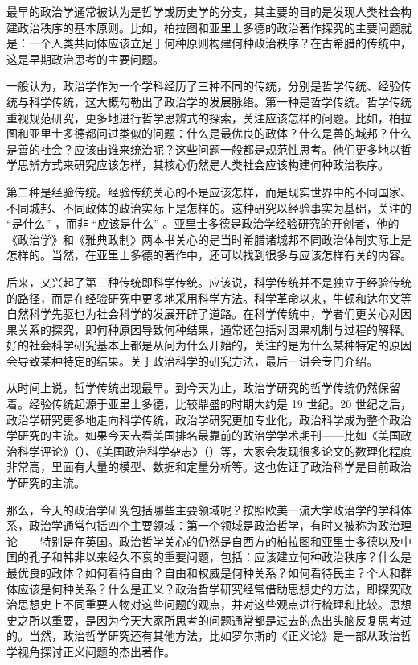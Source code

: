 最早的政治学通常被认为是哲学或历史学的分支，其主要的目的是发现人类社会构建政治秩序的基本原则。比如，柏拉图和亚里士多德的政治著作探究的主要问题就是：一个人类共同体应该立足于何种原则构建何种政治秩序？在古希腊的传统中，这是早期政治思考的主要问题。

一般认为，政治学作为一个学科经历了三种不同的传统，分别是哲学传统、经验传统与科学传统，这大概勾勒出了政治学的发展脉络。第一种是哲学传统。哲学传统重视规范研究，更多地进行哲学思辨式的探索，关注应该怎样的问题。比如，柏拉图和亚里士多德都问过类似的问题：什么是最优良的政体？什么是善的城邦？什么是善的社会？应该由谁来统治呢？这些问题一般都是规范性思考。他们更多地以哲学思辨方式来研究应该怎样，其核心仍然是人类社会应该构建何种政治秩序。

第二种是经验传统。经验传统关心的不是应该怎样，而是现实世界中的不同国家、不同城邦、不同政体的政治实际上是怎样的。这种研究以经验事实为基础，关注的 “是什么” ，而非 “应该是什么” 。亚里士多德是政治学经验研究的开创者，他的《政治学》和《雅典政制》两本书关心的是当时希腊诸城邦不同政治体制实际上是怎样的。当然，在亚里士多德的著作中，还可以找到很多与应该怎样有关的内容。

后来，又兴起了第三种传统即科学传统。应该说，科学传统并不是独立于经验传统的路径，而是在经验研究中更多地采用科学方法。科学革命以来，牛顿和达尔文等自然科学先驱也为社会科学的发展开辟了道路。在科学传统中，学者们更关心对因果关系的探究，即何种原因导致何种结果，通常还包括对因果机制与过程的解释。好的社会科学研究基本上都是从问为什么开始的，关注的是为什么某种特定的原因会导致某种特定的结果。关于政治科学的研究方法，最后一讲会专门介绍。

从时间上说，哲学传统出现最早。到今天为止，政治学研究的哲学传统仍然保留着。经验传统起源于亚里士多德，比较鼎盛的时期大约是 19 世纪。20 世纪之后，政治学研究更多地走向科学传统，政治学研究更加专业化，政治科学成为整个政治学研究的主流。如果今天去看美国排名最靠前的政治学学术期刊——比如《美国政治科学评论》（）、《美国政治科学杂志》（）等，大家会发现很多论文的数理化程度非常高，里面有大量的模型、数据和定量分析等。这也佐证了政治科学是目前政治学研究的主流。

那么，今天的政治学研究包括哪些主要领域呢？按照欧美一流大学政治学的学科体系，政治学通常包括四个主要领域：第一个领域是政治哲学，有时又被称为政治理论——特别是在英国。政治哲学关心的仍然是自西方的柏拉图和亚里士多德以及中国的孔子和韩非以来经久不衰的重要问题，包括：应该建立何种政治秩序？什么是最优良的政体？如何看待自由？自由和权威是何种关系？如何看待民主？个人和群体应该是何种关系？什么是正义？政治哲学研究经常借助思想史的方法，即探究政治思想史上不同重要人物对这些问题的观点，并对这些观点进行梳理和比较。思想史之所以重要，是因为今天大家所思考的问题通常都是过去的杰出头脑反复思考过的。当然，政治哲学研究还有其他方法，比如罗尔斯的《正义论》是一部从政治哲学视角探讨正义问题的杰出著作。

